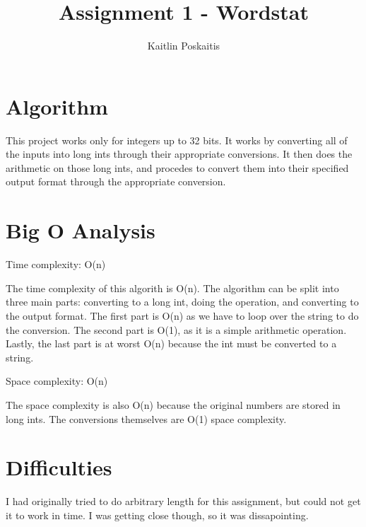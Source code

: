 \documentclass[11pt]{article}
\title{\bf Assignment 1 - Wordstat}
\author{Kaitlin Poskaitis}
\date{}
\begin{document}
\maketitle

\section*{Algorithm}

This project works only for integers up to 32 bits. It works by converting all 
of the inputs into long ints through their appropriate conversions. It then does
the arithmetic on those long ints, and procedes to convert them into their 
specified output format through the appropriate conversion. 

\section*{Big O Analysis}

Time complexity: O(n)

The time complexity of this algorith is O(n). The algorithm can be split into 
three main parts: converting to a long int, doing the operation, and converting 
to the output format. The first part is O(n) as we have to loop over the string
to do the conversion. The second part is O(1), as it is a simple arithmetic 
operation. Lastly, the last part is at worst O(n) because the int must be 
converted to a string.

Space complexity: O(n)

The space complexity is also O(n) because the original numbers are stored in 
long ints. The conversions themselves are O(1) space complexity.

\section*{Difficulties}

I had originally tried to do arbitrary length for this assignment, but could not
get it to work in time. I was getting close though, so it was dissapointing.
\end{document}
